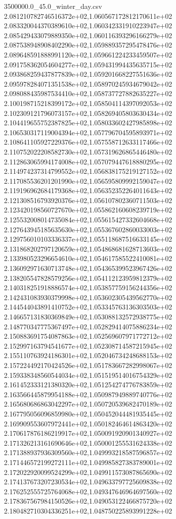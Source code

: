\begin{filecontents*}{3500000.0_45.0_winter_day.csv}
2.081210782746516372e+02,1.060567172812170611e+02
2.083320044370389610e+02,1.060342331910223947e+02
2.085429433079889350e+02,1.060116393296166279e+02
2.087538948908402290e+02,1.059889357295478476e+02
2.089648591888991120e+02,1.059661224233459507e+02
2.091758362054604277e+02,1.059431994435635715e+02
2.093868259437877839e+02,1.059201668227551636e+02
2.095978284071351538e+02,1.058970245934679042e+02
2.098088435987534410e+02,1.058737727882635227e+02
2.100198715218399172e+02,1.058504114397092053e+02
2.102309121796073157e+02,1.058269405803630434e+02
2.104419655752387825e+02,1.058033602427985898e+02
2.106530317119004394e+02,1.057796704595893971e+02
2.108641105927229376e+02,1.057558712633117466e+02
2.110752022208582730e+02,1.057319626865446480e+02
2.112863065994174008e+02,1.057079447618880295e+02
2.114974237314799552e+02,1.056838175219127152e+02
2.117085536201201990e+02,1.056595809992159047e+02
2.119196962684179368e+02,1.056352352264011643e+02
2.121308516793920376e+02,1.056107802360711503e+02
2.123420198560727670e+02,1.055862160608239719e+02
2.125532008014735084e+02,1.055615427332604668e+02
2.127643945185635630e+02,1.055367602860033003e+02
2.129756010103336337e+02,1.055118687516633145e+02
2.131868202797120659e+02,1.054868681628713603e+02
2.133980523296654610e+02,1.054617585522410081e+02
2.136092971630713748e+02,1.054365399523967426e+02
2.138205547828579256e+02,1.054112123959812379e+02
2.140318251918886574e+02,1.053857759156244356e+02
2.142431083930379998e+02,1.053602305439562770e+02
2.144544043891410752e+02,1.053345763136303503e+02
2.146657131830369849e+02,1.053088132572938775e+02
2.148770347775367497e+02,1.052829414075886234e+02
2.150883691754087863e+02,1.052569607971772712e+02
2.152997163794541677e+02,1.052308714587215945e+02
2.155110763924186301e+02,1.052046734248688153e+02
2.157224492170424526e+02,1.051783667282998067e+02
2.159338348560544034e+02,1.051519514016754329e+02
2.161452333121380320e+02,1.051254274776783859e+02
2.163566445879954188e+02,1.050987949889740776e+02
2.165680686863042297e+02,1.050720539682470189e+02
2.167795056096859980e+02,1.050452044481935445e+02
2.169909553607972441e+02,1.050182464614863420e+02
2.170617876186219917e+02,1.050091920901340927e+02
2.171326213161690646e+02,1.050001255531624338e+02
2.171388937936309560e+02,1.049993218587596857e+02
2.171446572199272111e+02,1.049985827383789001e+02
2.172022920099524299e+02,1.049911573087865690e+02
2.174137673207230534e+02,1.049633797725609838e+02
2.176252555725764068e+02,1.049347646964697560e+02
2.178367567984150526e+02,1.049053122466875720e+02
2.180482710304336251e+02,1.048750225893991228e+02

\end{filecontents*}
